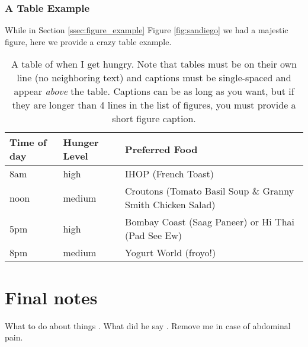 \documentclass[12pt,final,phd,chapterheads]{ucsd}  %
\begin{document}
\subsection{A Table Example}

While in Section \ref{ssec:figure_example} Figure \ref{fig:sandiego} we had a majestic figure, here we provide a crazy table example.


\vspace{0.25in}  %
\begin{table}[!ht]
\caption[Short figure caption (must be  lines in the list of tables)]{A table of when I get hungry.  Note that tables must be on their own line (no neighboring text) and captions must be single-spaced and appear \protect\textit{above} the table.  Captions can be as long as you want, but if they are longer than 4 lines in the list of figures, you must provide a short figure caption.}
\vspace{-0.15in}  %

\begin{center}
\begin{tabular}{|p{}|p{}|p{}|}

\hline
Time of day & Hunger Level & Preferred Food \\

\hline
8am & high & IHOP (French Toast) \\

\hline
noon & medium & Croutons (Tomato Basil Soup \& Granny Smith Chicken Salad) \\

\hline
5pm & high & Bombay Coast (Saag Paneer) or Hi Thai (Pad See Ew) \\

\hline
8pm & medium & Yogurt World (froyo!) \\

\hline
\end{tabular}
\end{center}
\label{tab:analysis3}
\end{table}



\appendix
\chapter{Final notes}
What to do about things \cite{Martin_1983}.  What did he say \cite{Rilling_Insel_1999}.
  Remove me in case of abdominal pain.
\end{document}
